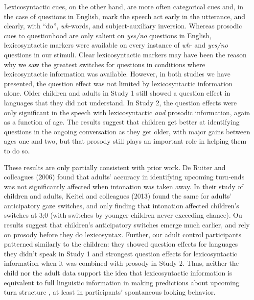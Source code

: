 \documentclass[authoryear, 12pt]{elsarticle}
\begin{document}
Lexicosyntactic cues, on the other hand, are more often categorical cues and, in the case of questions in English, mark the speech act early in the utterance, and clearly, with ``do'', \textit{wh}-words, and subject-auxiliary inversion. Whereas prosodic cues to questionhood are only salient on \textit{yes/no} questions in English, lexicosyntactic markers were available on every instance of \textit{wh}- and \textit{yes/no} questions in our stimuli. Clear lexicosyntactic markers may have been the reason why we saw the greatest switches for questions in conditions where lexicosyntactic information was available. However, in both studies we have presented, the question effect was not limited by lexicosyntactic information alone. Older children and adults in Study 1 still showed a question effect in languages that they did not understand. In Study 2, the question effects were only significant in the speech with lexicosyntactic \textit{and} prosodic information, again as a function of age. The results suggest that children get better at identifying questions in the ongoing conversation as they get older, with major gains between ages one and two, but that prosody still plays an important role in helping them to do so.

These results are only partially consistent with prior work. De Ruiter and colleagues (2006) found that adults' accuracy in identifying upcoming turn-ends was not significantly affected when intonation was taken away. In their study of children and adults, Keitel and colleagues (2013) found the same for adults' anticipatory gaze switches, and only finding that intonation affected children's switches at 3;0 (with switches by younger children never exceeding chance). Ou results suggest that children's anticipatory switches emerge much earlier, and rely on prosody before they do lexicosyntax. Further, our adult control participants patterned similarly to the children: they showed question effects for languages they didn't speak in Study 1 and strongest question effects for lexicosyntactic information when it was combined with prosody in Study 2. Thus, neither the child nor the adult data support the idea that lexicosyntactic information is equivalent to full linguistic information in making predictions about upcoming turn structure \citep{de-ruiter2006}, at least in participants' spontaneous looking behavior.
\end{document}
